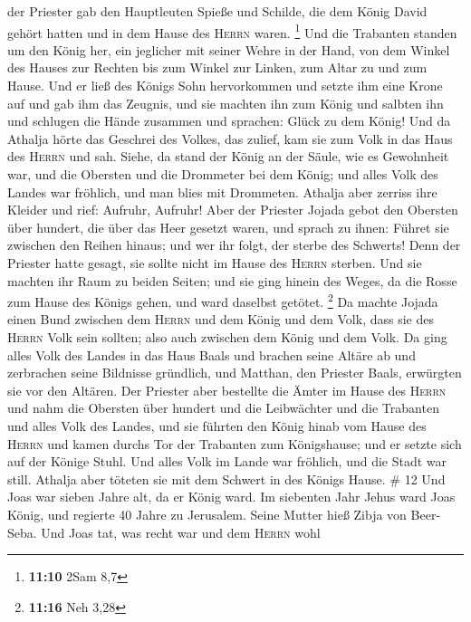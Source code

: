 der Priester gab den Hauptleuten Spieße und Schilde, die dem König David
gehört hatten und in dem Hause des \textsc{Herrn} waren. \footnote{\textbf{11:10}
  2Sam 8,7}  Und die Trabanten standen um den König her,
ein jeglicher mit seiner Wehre in der Hand, von dem Winkel des Hauses
zur Rechten bis zum Winkel zur Linken, zum Altar zu und zum Hause.
 Und er ließ des Königs Sohn hervorkommen und setzte ihm
eine Krone auf und gab ihm das Zeugnis, und sie machten ihn zum König
und salbten ihn und schlugen die Hände zusammen und sprachen: Glück zu
dem König!  Und da Athalja hörte das Geschrei des Volkes,
das zulief, kam sie zum Volk in das Haus des \textsc{Herrn}
 und sah. Siehe, da stand der König an der Säule, wie es
Gewohnheit war, und die Obersten und die Drommeter bei dem König; und
alles Volk des Landes war fröhlich, und man blies mit Drommeten. Athalja
aber zerriss ihre Kleider und rief: Aufruhr, Aufruhr! 
Aber der Priester Jojada gebot den Obersten über hundert, die über das
Heer gesetzt waren, und sprach zu ihnen: Führet sie zwischen den Reihen
hinaus; und wer ihr folgt, der sterbe des Schwerts! Denn der Priester
hatte gesagt, sie sollte nicht im Hause des \textsc{Herrn} sterben.
 Und sie machten ihr Raum zu beiden Seiten; und sie ging
hinein des Weges, da die Rosse zum Hause des Königs gehen, und ward
daselbst getötet. \footnote{\textbf{11:16} Neh 3,28}  Da
machte Jojada einen Bund zwischen dem \textsc{Herrn} und dem König und
dem Volk, dass sie des \textsc{Herrn} Volk sein sollten; also auch
zwischen dem König und dem Volk.  Da ging alles Volk des
Landes in das Haus Baals und brachen seine Altäre ab und zerbrachen
seine Bildnisse gründlich, und Matthan, den Priester Baals, erwürgten
sie vor den Altären. Der Priester aber bestellte die Ämter im Hause des
\textsc{Herrn}  und nahm die Obersten über hundert und
die Leibwächter und die Trabanten und alles Volk des Landes, und sie
führten den König hinab vom Hause des \textsc{Herrn} und kamen durchs
Tor der Trabanten zum Königshause; und er setzte sich auf der Könige
Stuhl.  Und alles Volk im Lande war fröhlich, und die
Stadt war still. Athalja aber töteten sie mit dem Schwert in des Königs
Hause. \# 12  Und Joas war sieben Jahre alt, da er König
ward.  Im siebenten Jahr Jehus ward Joas König, und
regierte 40 Jahre zu Jerusalem. Seine Mutter hieß Zibja von Beer-Seba.
 Und Joas tat, was recht war und dem \textsc{Herrn} wohl
